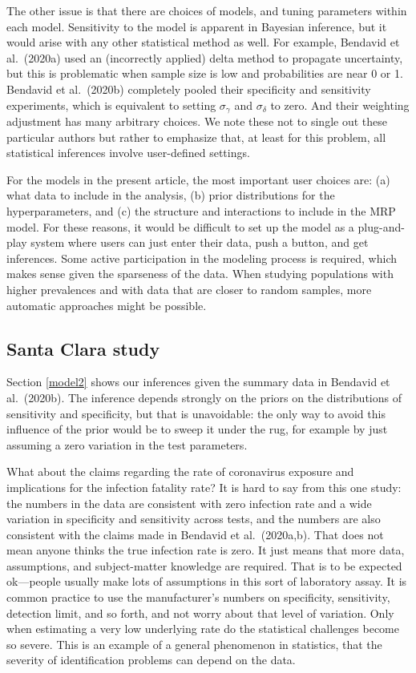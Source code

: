\documentclass[11pt]{article}
\begin{document}
The other issue is that there are choices of models, and tuning parameters within each model.  Sensitivity to the model is apparent in Bayesian inference, but it would arise with any other statistical method as well.  For example, Bendavid et al.\ (2020a) used an (incorrectly applied) delta method to propagate uncertainty, but this is problematic when sample size is low and probabilities are near 0 or 1.  Bendavid  et al.\ (2020b) completely pooled their specificity and sensitivity experiments, which is equivalent to setting $\sigma_{\gamma}$ and $\sigma_{\delta}$ to zero.  And their weighting adjustment has many arbitrary choices.  We note these not to single out these particular authors but rather to emphasize that, at least for this problem, all statistical inferences involve user-defined settings.

For the models in the present article, the most important user choices are:  (a) what data to include in the analysis, (b) prior distributions for the hyperparameters, and (c) the structure and interactions to include in the MRP model.  For these reasons, it would be difficult to set up the model as a plug-and-play system where users can just enter their data, push a button, and get inferences.  Some active participation in the modeling process is required, which makes sense given the sparseness of the data.  When studying populations with higher prevalences and with data that are closer to random samples, more automatic approaches might be possible.

\subsection{Santa Clara study}

Section \ref{model2} shows our inferences given the summary data in Bendavid et al.\ (2020b).
The inference depends strongly on the priors on the distributions of sensitivity and specificity, but that is unavoidable:  the only way to avoid this influence of the prior would be to sweep it under the rug, for example by just assuming a zero variation in the test parameters.

What about the claims regarding the rate of coronavirus exposure and implications for the infection fatality rate?  It is hard to say from this one study:  the numbers in the data are consistent with zero infection rate and a wide variation in specificity and sensitivity across tests, and the numbers are also consistent with the claims made in Bendavid et al.\ (2020a,b). That does not mean anyone thinks the true infection rate is zero.  It just means that more data, assumptions, and subject-matter knowledge are required. That is to be expected ok---people usually make lots of assumptions in this sort of laboratory assay. It is common practice to use the manufacturer's numbers on specificity, sensitivity, detection limit, and so forth, and not worry about that level of variation. Only when estimating a very low underlying rate do the statistical challenges become so severe. This is an example of a general phenomenon in statistics, that the severity of identification problems can depend on the data.
\end{document}
